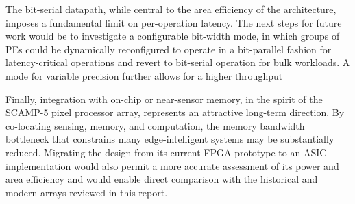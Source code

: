         The bit-serial datapath, while central to the area efficiency of the architecture, imposes a fundamental limit on per-operation latency. The next steps for future work would be to investigate a configurable bit-width mode, in which groups of PEs could be dynamically reconfigured to operate in a bit-parallel fashion for latency-critical operations and revert to bit-serial operation for bulk workloads. A mode for variable precision further allows for a higher throughput 
        
        Finally, integration with on-chip or near-sensor memory, in the spirit of the SCAMP-5 pixel processor array, represents an attractive long-term direction. By co-locating sensing, memory, and computation, the memory bandwidth bottleneck that constrains many edge-intelligent systems may be substantially reduced. Migrating the design from its current FPGA prototype to an ASIC implementation would also permit a more accurate assessment of its power and area efficiency and would enable direct comparison with the historical and modern arrays reviewed in this report.
    

\printbibliography[title={References},heading=bibintoc] %



